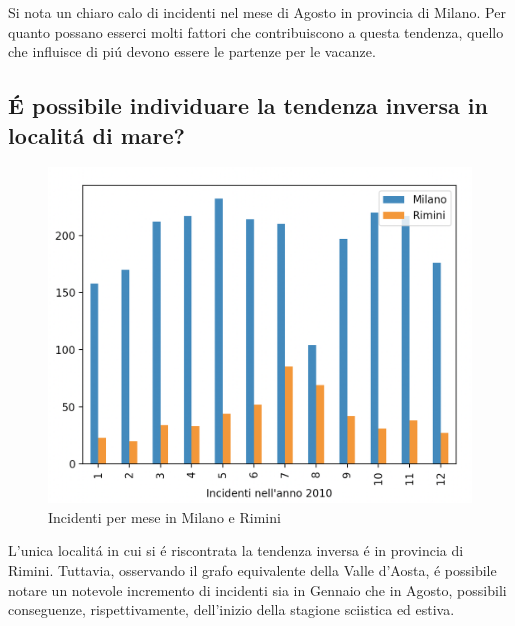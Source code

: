\documentclass[a4paper]{report}
\begin{document}
Si nota un chiaro calo di incidenti nel mese di Agosto in provincia di Milano.
Per quanto possano esserci molti fattori che contribuiscono a questa tendenza, 
quello che influisce di pi\'u devono essere le partenze per le vacanze.

\newpage
\subsection{\'E possibile individuare la tendenza inversa in localit\'a  di mare?}

\begin{figure}[!ht]
    \includegraphics[width=\linewidth]{../src/incidenti/incidenti_senza_coords/mese_incidenti/milano_rimini.png}
    \caption{Incidenti per mese in Milano e Rimini}
    \label{fig:milano_rimini}
\end{figure}

L'unica localit\'a in cui si \'e riscontrata la tendenza inversa \'e in provincia 
di Rimini.
Tuttavia, osservando il grafo equivalente della Valle d'Aosta, \'e possibile notare 
un notevole incremento di incidenti sia in Gennaio che in Agosto, possibili 
conseguenze, rispettivamente, dell'inizio della stagione sciistica ed estiva.
\end{document}
